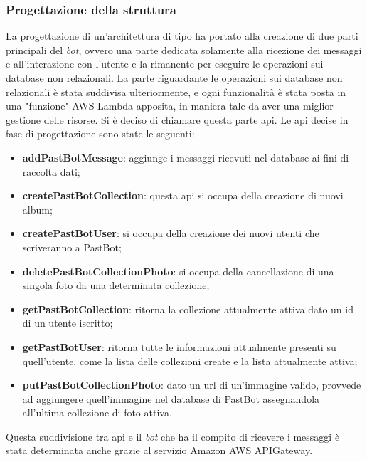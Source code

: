 \subsubsection{Progettazione della struttura }
\label{prj:serverless:api}
La progettazione di un'architettura di tipo  ha
portato alla creazione di due parti principali del \textit{bot}, ovvero una
parte dedicata solamente alla ricezione dei messaggi e all'interazione con
l'utente e la rimanente per eseguire le operazioni sui database non relazionali.
La parte riguardante le operazioni sui database non relazionali è stata
suddivisa ulteriormente, e ogni funzionalità è stata posta in una "funzione"
AWS Lambda apposita, in maniera tale da aver una miglior gestione delle
risorse. Si è deciso di chiamare questa parte \gls{api}. Le \gls{api} decise in
fase di progettazione sono state le seguenti:
\begin{itemize}
  \item \textbf{addPastBotMessage}: aggiunge i messaggi ricevuti nel database
ai fini di raccolta dati;

  \item \textbf{createPastBotCollection}: questa \gls{api} si occupa della
creazione di nuovi album;

  \item \textbf{createPastBotUser}: si occupa della creazione dei nuovi utenti
che scriveranno a PastBot;

  \item \textbf{deletePastBotCollectionPhoto}: si occupa della cancellazione di
una singola foto da una determinata collezione;

  \item \textbf{getPastBotCollection}: ritorna la collezione attualmente attiva
dato un id di un utente iscritto;

  \item \textbf{getPastBotUser}: ritorna tutte le informazioni attualmente
presenti su quell'utente, come la lista delle collezioni create e la lista
attualmente attiva;

  \item \textbf{putPastBotCollectionPhoto}: dato un \gls{url} di un'immagine
valido, provvede ad aggiungere quell'immagine nel database di PastBot
assegnandola all'ultima collezione di foto attiva.
\end{itemize}

Questa suddivisione tra \gls{api} e il \textit{bot} che ha il compito di
ricevere i messaggi è stata determinata anche grazie al servizio Amazon AWS
APIGateway.

